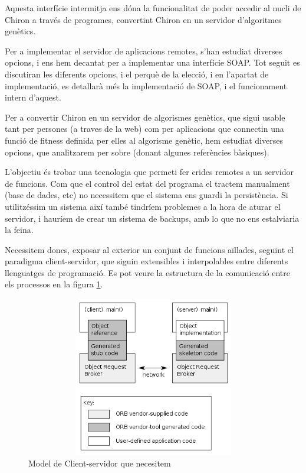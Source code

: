Aquesta interfície intermitja ens dóna la funcionalitat de poder accedir al
nucli de Chiron a través de programes, convertint Chiron en un servidor 
d'algoritmes genètics.

Per a implementar el servidor de aplicacions remotes, s'han estudiat diverses
opcions, i ens hem decantat per a implementar una interfície SOAP.  Tot seguit
es discutiran les diferents opcions, i el perquè de la elecció, i en l'apartat
de implementació, es detallarà més la implementació de SOAP, i el funcionament
intern d'aquest.


Per a convertir Chiron en un servidor de algorismes genètics, que sigui usable
tant per persones (a traves de la web) com per aplicacions que connectin una
funció de fitness definida per elles al algorisme genètic, hem estudiat diverses
opcions, que analitzarem per sobre (donant algunes referències bàsiques).

L'objectiu és trobar una tecnologia que permeti fer crides remotes a un servidor
de funcions.  Com que el control del estat del programa el tractem manualment
(base de dades, etc) no necessitem que el sistema ens guardi la persistència.
Si utilitzéssim un sistema així també tindríem problemes a la hora de aturar el
servidor, i hauríem de crear un sistema de backups, amb lo que no ens
estalviaria la feina.

Necessitem doncs, exposar al exterior un conjunt de funcions aïllades, seguint el
paradigma client-servidor, que siguin extensibles i interpolables entre
diferents llenguatges de programació. Es pot veure la estructura de la
comunicació entre els processos en la figura \ref{fig:401px-Orb.png}.

\begin{figure}[h]
\centering
\includegraphics[width=13cm,height=7cm]{401px-Orb.png}
\caption{Model de Client-servidor que necesitem}
\label{fig:401px-Orb.png}
\end{figure} 

